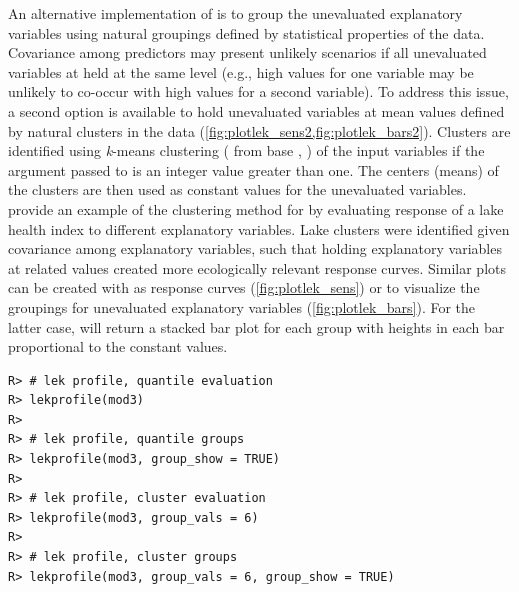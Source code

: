 \documentclass[article,shortnames]{jss}\usepackage[]{graphicx}\usepackage[]{color}
\makeatletter
\newenvironment{kframe}{%
 \def\at@end@of@kframe{}%
 \ifinner\ifhmode%
  \def\at@end@of@kframe{\end{minipage}}%
  \begin{minipage}{\columnwidth}%
 \fi\fi%
 \def\FrameCommand##1{\hskip\@totalleftmargin \hskip-\fboxsep
 \colorbox{shadecolor}{##1}\hskip-\fboxsep
     \hskip-\linewidth \hskip-\@totalleftmargin \hskip\columnwidth}%
 \MakeFramed {\advance\hsize-\width
   \@totalleftmargin\z@ \linewidth\hsize
   \@setminipage}}%
 {\par\unskip\endMakeFramed%
 \at@end@of@kframe}
\newenvironment{knitrout}{}{} %
\makeatother
\begin{document}
An alternative implementation of  is to group the unevaluated explanatory variables using natural groupings defined by statistical properties of the data. Covariance among predictors may present unlikely scenarios if all unevaluated variables at held at the same level (e.g., high values for one variable may be unlikely to co-occur with high values for a second variable). To address this issue, a second option is available to hold unevaluated variables at mean values defined by natural clusters in the data (\cref{fig:plotlek_sens2,fig:plotlek_bars2}). Clusters are identified using {\it k}-means clustering ( from base , \citealt{Hartigan79}) of the input variables if the argument passed to  is an integer value greater than one. The centers (means) of the clusters are then used as constant values for the unevaluated variables.  \citet{Beck14a} provide an example of the clustering method for  by evaluating response of a lake health index to different explanatory variables.  Lake clusters were identified given covariance among explanatory variables, such that holding explanatory variables at related values created more ecologically relevant response curves.  Similar plots can be created with  as response curves (\cref{fig:plotlek_sens}) or to visualize the groupings for unevaluated explanatory variables (\cref{fig:plotlek_bars}).  For the latter case,  will return a stacked bar plot for each group with heights in each bar proportional to the constant values.
\begin{knitrout}
\color{fgcolor}\begin{kframe}
\begin{verbatim}
R> # lek profile, quantile evaluation
R> lekprofile(mod3)
R> 
R> # lek profile, quantile groups 
R> lekprofile(mod3, group_show = TRUE)
R> 
R> # lek profile, cluster evaluation
R> lekprofile(mod3, group_vals = 6)
R> 
R> # lek profile, cluster groups
R> lekprofile(mod3, group_vals = 6, group_show = TRUE)
\end{verbatim}
\end{kframe}
\end{knitrout}
\end{document}
